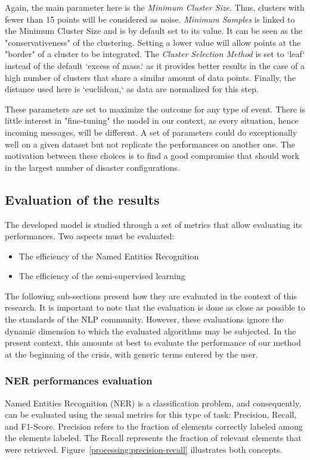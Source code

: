 Again, the main parameter here is the \textit{Minimum Cluster Size}.
Thus, clusters with fewer than 15 points will be considered as noise.
\textit{Minimum Samples} is linked to the Minimum Cluster Size and is by default set to its value.
It can be seen as the "conservativeness" of the clustering.
Setting a lower value will allow points at the "border" of a cluster to be integrated.
The \textit{Cluster Selection Method} is set to `leaf` instead of the default `excess of mass.`
as it provides better results in the case of a high number of clusters that share a similar amount of data points.
Finally, the distance used here is `euclidean,` as data are normalized for this step.

These parameters are set to maximize the outcome for any type of event.
There is little interest in "fine-tuning" the model in our context, as every situation, hence incoming messages, will be different.
A set of parameters could do exceptionally well on a given dataset but not replicate the performances on another one.
The motivation between these choices is to find a good compromise that should work in the largest number of disaster configurations.

\subsection{Evaluation of the results}
The developed model is studied through a set of metrics that allow evaluating its performances.
Two aspects must be evaluated:

\begin{itemize}
    \item The efficiency of the Named Entities Recognition
    \item The efficiency of the semi-supervised learning
\end{itemize}

The following sub-sections present how they are evaluated in the context of this research.
It is important to note that the evaluation is done as close as possible to the standards of the NLP community.
However, these evaluations ignore the dynamic dimension to which the evaluated algorithms may be subjected.
In the present context, this amounts at best to evaluate the performance of our method at the beginning of the crisis, with generic terms entered by the user.

\subsubsection{NER performances evaluation}
Named Entities Recognition (NER) is a classification problem, and consequently, can be evaluated
using the usual metrics for this type of task: Precision, Recall, and F1-Score.
Precision refers to the fraction of elements correctly labeled among the elements labeled.
The Recall represents the fraction of relevant elements that were retrieved.
Figure~\ref{processing:precision-recall} illustrates both concepts.

